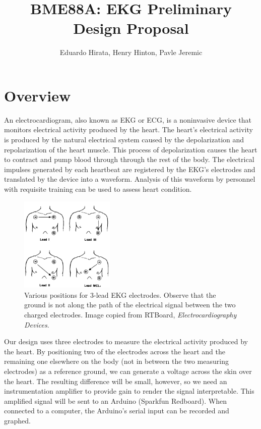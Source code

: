 \documentclass[11pt, oneside]{article}   	%
\title{BME88A: EKG Preliminary Design Proposal}
\author{Eduardo Hirata, Henry Hinton, Pavle Jeremic}
\begin{document}
\maketitle
\section{Overview}
	
	\onehalfspace

\par An electrocardiogram, also known as EKG or ECG, is a noninvasive device that monitors electrical activity produced by the heart. The heart's electrical activity is produced by the natural electrical system caused by the depolarization and repolarization of the heart muscle. This process of depolarization causes the heart to contract and pump blood through through the rest of the body. The electrical impulses generated by each heartbeat are registered by the EKG's electrodes and translated by the device into a waveform. Analysis of this waveform by personnel with requisite training can be used to assess heart condition.
 

\begin{figure}
	\includegraphics[width=0.4\textwidth]{ecg}
	\caption{Various positions for 3-lead EKG electrodes. Observe that the ground is not along the path of the electrical signal between the two charged electrodes. \cite{ecgpos} Image copied from RTBoard, \textit{Electrocardiography Devices}.}
\end{figure}

\par Our design uses three electrodes to measure the electrical activity produced by the heart. By positioning two of the electrodes across the heart and the remaining one elsewhere on the body (not in between the two measuring electrodes) as a reference ground, we can generate a voltage across the skin over the heart. The resulting difference will be small, however, so we need an instrumentation amplifier to provide gain to render the signal interpretable. This amplified signal will be sent to an Arduino (Sparkfun Redboard). When connected to a computer, the Arduino's serial input can be recorded and graphed.
\end{document}
